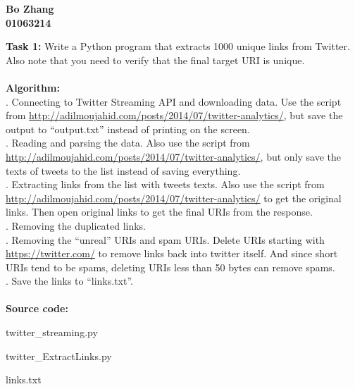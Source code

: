 \documentclass{article}
\begin{document}
		\begin{center}\textbf{Bo Zhang\\01063214\\}
		\end{center}
		\noindent
		\textbf{Task 1: }Write a Python program that extracts 1000 unique links from Twitter. Also note that you need to verify that the final target URI is unique.\\\\
		\textbf{Algorithm: }\\
		. Connecting to Twitter Streaming API and downloading data. Use the script from \url{http://adilmoujahid.com/posts/2014/07/twitter-analytics/}, but save the output to ``output.txt'' instead of printing on the screen.\\
		. Reading and parsing the data. Also use the script from \url{http://adilmoujahid.com/posts/2014/07/twitter-analytics/}, but only save the texts of tweets to the list instead of saving everything.\\
		. Extracting links from the list with tweets texts. Also use the script from \url{http://adilmoujahid.com/posts/2014/07/twitter-analytics/} to get the original links. Then open original links to get the final URIs from the response.\\
		. Removing the duplicated links.\\
		. Removing the ``unreal'' URIs and spam URIs. Delete URIs starting with \url{https://twitter.com/} to remove links back into twitter itself. And since short URIs tend to be spams, deleting URIs less than 50 bytes can remove spams.\\
		. Save the links to ``links.txt''.\\\\
		\textbf{Source code:}
		\begin{list}{}
			\item twitter\_streaming.py
			\item twitter\_ExtractLinks.py
		\end{list}
		\begin{list}{\textbf{Results:}}
			\item links.txt
		\end{list}
\end{document}
